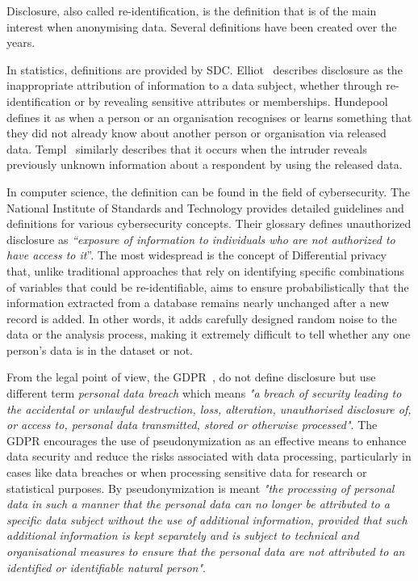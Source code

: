 \documentclass{article}
\begin{document}
Disclosure, also called re-identification, is the definition that is of the main interest when anonymising data.
Several definitions have been created over the years. 

In statistics, definitions are provided by SDC. Elliot~\cite{2009_Elliot}  describes disclosure as the inappropriate attribution of information to a data 
subject, whether through re-identification or by revealing sensitive attributes or memberships. Hundepool~\cite{2012_Hundepool} defines it as when a person or an organisation recognises or learns something that they did not already know about another person or organisation via released data. Templ~\cite{2014_Templ} similarly describes that it occurs when the intruder reveals previously unknown information about a respondent by using the released data.

In computer science, the definition can be found in the field of cybersecurity. The National Institute of Standards and Technology provides detailed guidelines and definitions for various cybersecurity concepts. Their glossary \cite{2023_NIST} defines unauthorized disclosure as \textit{“exposure of information to individuals who are not authorized to have access to it}”.  The most widespread is the concept of Differential privacy \cite{2006_Dwork} that, unlike traditional approaches that rely on identifying specific combinations of variables that could be re-identifiable, aims to ensure probabilistically that the information extracted from a database remains nearly unchanged after a new record is added. In other words, it adds carefully designed random noise to the data or the analysis process, making it extremely difficult to tell whether any one person’s data is in the dataset or not. 

From the legal point of view, the GDPR~\cite{2016_EU_2016/679}, do not define disclosure but use different term \textit{personal data breach} which means \textit{"a breach of security leading to the accidental or unlawful destruction, loss, alteration, unauthorised disclosure of, or access to, personal data transmitted, stored or otherwise processed"}. The GDPR encourages the use of pseudonymization as an effective means to enhance data security and reduce the risks associated with data processing, particularly in cases like data breaches or when processing sensitive data for research or statistical purposes. By pseudonymization is meant \textit{"the processing of personal data in such a manner that the personal data can no longer be attributed to a specific data subject without the use of additional information, provided that such additional information is kept separately and is subject to technical and organisational measures to ensure that the personal data are not attributed to an identified or identifiable natural person"}.
\newline
\end{document}
